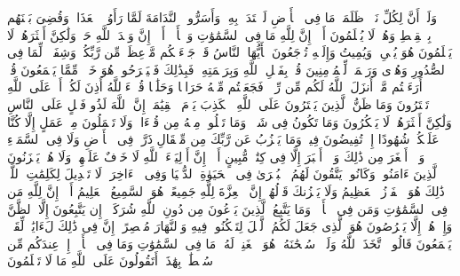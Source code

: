 \stopbuffer%
\startbuffer[\q:10:54]
وَلَوۡ أَنَّ لِكُلِّ نَفۡسࣲ ظَلَمَتۡ مَا فِی ٱلۡأَرۡضِ لَٱفۡتَدَتۡ بِهِۦۗ وَأَسَرُّوا۟ ٱلنَّدَامَةَ لَمَّا رَأَوُا۟ ٱلۡعَذَابَۖ وَقُضِیَ بَیۡنَهُم بِٱلۡقِسۡطِ وَهُمۡ لَا یُظۡلَمُونَ%
\stopbuffer%
\startbuffer[\q:10:55]
أَلَاۤ إِنَّ لِلَّهِ مَا فِی ٱلسَّمَٰوَٰتِ وَٱلۡأَرۡضِۗ أَلَاۤ إِنَّ وَعۡدَ ٱللَّهِ حَقࣱّ وَلَٰكِنَّ أَكۡثَرَهُمۡ لَا یَعۡلَمُونَ%
\stopbuffer%
\startbuffer[\q:10:56]
هُوَ یُحۡیِۦ وَیُمِیتُ وَإِلَیۡهِ تُرۡجَعُونَ%
\stopbuffer%
\startbuffer[\q:10:57]
یَٰۤأَیُّهَا ٱلنَّاسُ قَدۡ جَاۤءَتۡكُم مَّوۡعِظَةࣱ مِّن رَّبِّكُمۡ وَشِفَاۤءࣱ لِّمَا فِی ٱلصُّدُورِ وَهُدࣰى وَرَحۡمَةࣱ لِّلۡمُؤۡمِنِینَ%
\stopbuffer%
\startbuffer[\q:10:58]
قُلۡ بِفَضۡلِ ٱللَّهِ وَبِرَحۡمَتِهِۦ فَبِذَٰلِكَ فَلۡیَفۡرَحُوا۟ هُوَ خَیۡرࣱ مِّمَّا یَجۡمَعُونَ%
\stopbuffer%
\startbuffer[\q:10:59]
قُلۡ أَرَءَیۡتُم مَّاۤ أَنزَلَ ٱللَّهُ لَكُم مِّن رِّزۡقࣲ فَجَعَلۡتُم مِّنۡهُ حَرَامࣰا وَحَلَٰلࣰا قُلۡ ءَاۤللَّهُ أَذِنَ لَكُمۡۖ أَمۡ عَلَى ٱللَّهِ تَفۡتَرُونَ%
\stopbuffer%
\startbuffer[\q:10:60]
وَمَا ظَنُّ ٱلَّذِینَ یَفۡتَرُونَ عَلَى ٱللَّهِ ٱلۡكَذِبَ یَوۡمَ ٱلۡقِیَٰمَةِۗ إِنَّ ٱللَّهَ لَذُو فَضۡلٍ عَلَى ٱلنَّاسِ وَلَٰكِنَّ أَكۡثَرَهُمۡ لَا یَشۡكُرُونَ%
\stopbuffer%
\startbuffer[\q:10:61]
وَمَا تَكُونُ فِی شَأۡنࣲ وَمَا تَتۡلُوا۟ مِنۡهُ مِن قُرۡءَانࣲ وَلَا تَعۡمَلُونَ مِنۡ عَمَلٍ إِلَّا كُنَّا عَلَیۡكُمۡ شُهُودًا إِذۡ تُفِیضُونَ فِیهِۚ وَمَا یَعۡزُبُ عَن رَّبِّكَ مِن مِّثۡقَالِ ذَرَّةࣲ فِی ٱلۡأَرۡضِ وَلَا فِی ٱلسَّمَاۤءِ وَلَاۤ أَصۡغَرَ مِن ذَٰلِكَ وَلَاۤ أَكۡبَرَ إِلَّا فِی كِتَٰبࣲ مُّبِینٍ%
\stopbuffer%
\startbuffer[\q:10:62]
أَلَاۤ إِنَّ أَوۡلِیَاۤءَ ٱللَّهِ لَا خَوۡفٌ عَلَیۡهِمۡ وَلَا هُمۡ یَحۡزَنُونَ%
\stopbuffer%
\startbuffer[\q:10:63]
ٱلَّذِینَ ءَامَنُوا۟ وَكَانُوا۟ یَتَّقُونَ%
\stopbuffer%
\startbuffer[\q:10:64]
لَهُمُ ٱلۡبُشۡرَىٰ فِی ٱلۡحَیَوٰةِ ٱلدُّنۡیَا وَفِی ٱلۡءَاخِرَةِۚ لَا تَبۡدِیلَ لِكَلِمَٰتِ ٱللَّهِۚ ذَٰلِكَ هُوَ ٱلۡفَوۡزُ ٱلۡعَظِیمُ%
\stopbuffer%
\startbuffer[\q:10:65]
وَلَا یَحۡزُنكَ قَوۡلُهُمۡۘ إِنَّ ٱلۡعِزَّةَ لِلَّهِ جَمِیعًاۚ هُوَ ٱلسَّمِیعُ ٱلۡعَلِیمُ%
\stopbuffer%
\startbuffer[\q:10:66]
أَلَاۤ إِنَّ لِلَّهِ مَن فِی ٱلسَّمَٰوَٰتِ وَمَن فِی ٱلۡأَرۡضِۗ وَمَا یَتَّبِعُ ٱلَّذِینَ یَدۡعُونَ مِن دُونِ ٱللَّهِ شُرَكَاۤءَۚ إِن یَتَّبِعُونَ إِلَّا ٱلظَّنَّ وَإِنۡ هُمۡ إِلَّا یَخۡرُصُونَ%
\stopbuffer%
\startbuffer[\q:10:67]
هُوَ ٱلَّذِی جَعَلَ لَكُمُ ٱلَّیۡلَ لِتَسۡكُنُوا۟ فِیهِ وَٱلنَّهَارَ مُبۡصِرًاۚ إِنَّ فِی ذَٰلِكَ لَءَایَٰتࣲ لِّقَوۡمࣲ یَسۡمَعُونَ%
\stopbuffer%
\startbuffer[\q:10:68]
قَالُوا۟ ٱتَّخَذَ ٱللَّهُ وَلَدࣰاۗ سُبۡحَٰنَهُۥۖ هُوَ ٱلۡغَنِیُّۖ لَهُۥ مَا فِی ٱلسَّمَٰوَٰتِ وَمَا فِی ٱلۡأَرۡضِۚ إِنۡ عِندَكُم مِّن سُلۡطَٰنِۭ بِهَٰذَاۤۚ أَتَقُولُونَ عَلَى ٱللَّهِ مَا لَا تَعۡلَمُونَ%
